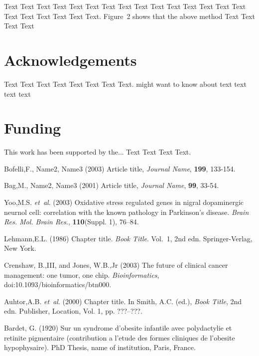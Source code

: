 \documentclass{bioinfo}
\begin{document}
Text Text Text Text Text Text  Text Text Text Text Text Text Text
Text Text  Text Text Text Text Text Text.
Figure~2\vphantom{\ref{fig:02}} shows that the above method  Text
Text Text Text\vspace*{-10pt}


\section*{Acknowledgements}

Text Text Text Text Text Text  Text Text.  \citealp{Boffelli03} might want to know about  text
text text text\vspace*{-12pt}

\section*{Funding}

This work has been supported by the... Text Text  Text Text.\vspace*{-12pt}

%
%
%
%
%
%
%
%
%


\begin{thebibliography}{}

Bofelli,F., Name2, Name3 (2003) Article title, {\it Journal Name}, {\bf 199}, 133-154.

Bag,M., Name2, Name3 (2001) Article title, {\it Journal Name}, {\bf 99}, 33-54.

Yoo,M.S. \textit{et~al}. (2003) Oxidative stress regulated genes
in nigral dopaminergic neurnol cell: correlation with the known
pathology in Parkinson's disease. \textit{Brain Res. Mol. Brain
Res.}, \textbf{110}(Suppl. 1), 76--84.

Lehmann,E.L. (1986) Chapter title. \textit{Book Title}. Vol.~1, 2nd edn. Springer-Verlag, New York.

Crenshaw, B.,III, and Jones, W.B.,Jr (2003) The future of clinical
cancer management: one tumor, one chip. \textit{Bioinformatics},
doi:10.1093/bioinformatics/btn000.

Auhtor,A.B. \textit{et~al}. (2000) Chapter title. In Smith, A.C.
(ed.), \textit{Book Title}, 2nd edn. Publisher, Location, Vol. 1, pp.
???--???.

Bardet, G. (1920) Sur un syndrome d'obesite infantile avec
polydactylie et retinite pigmentaire (contribution a l'etude des
formes cliniques de l'obesite hypophysaire). PhD Thesis, name of
institution, Paris, France.

\end{thebibliography}
\end{document}

